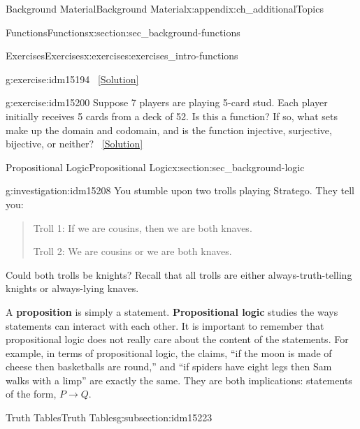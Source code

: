 \documentclass[oneside,10pt,]{book}
\newcommand{\terminology}[1]{\textbf{#1}}
\numberwithin{equation}{chapter}
\def\imp{\rightarrow}
\begin{document}
\begin{appendixptx}{Background Material}{}{Background Material}{}{}{x:appendix:ch_additionalTopics}
\begin{sectionptx}{Functions}{}{Functions}{}{}{x:section:sec_background-functions}
\begin{exercises-subsection}{Exercises}{}{Exercises}{}{}{x:exercises:exercises_intro-functions}
\begin{divisionexercise}{16}{}{}{g:exercise:idm15194}
\qquad~\hfill{\tiny\hyperlink{g:solution:idm15198-main}{[Solution]}}\end{divisionexercise}%
\begin{divisionexercise}{17}{}{}{g:exercise:idm15200}%
Suppose 7 players are playing 5-card stud. Each player initially receives 5 cards from a deck of 52. Is this a function? If so, what sets make up the domain and codomain, and is the function injective, surjective, bijective, or neither?%
\qquad~\hfill{\tiny\hyperlink{g:solution:idm15203-main}{[Solution]}}\end{divisionexercise}%
\end{exercises-subsection}
\end{sectionptx}
%
%
\typeout{************************************************}
\typeout{************************************************}
%
\begin{sectionptx}{Propositional Logic}{}{Propositional Logic}{}{}{x:section:sec_background-logic}
\begin{introduction}{}%
\begin{investigation}{}{g:investigation:idm15208}%
You stumble upon two trolls playing Stratego\textregistered{}.  They tell you:%
\begin{quote}%
Troll 1: If we are cousins, then we are both knaves.%
\par
Troll 2: We are cousins or we are both knaves.%
\end{quote}
Could both trolls be knights?  Recall that all trolls are either always-truth-telling knights or always-lying knaves.%
\end{investigation}
A \terminology{proposition} is simply a statement. \terminology{Propositional logic} studies the ways statements can interact with each other. It is important to remember that propositional logic does not really care about the content of the statements. For example, in terms of propositional logic, the claims, ``if the moon is made of cheese then basketballs are round,'' and ``if spiders have eight legs then Sam walks with a limp'' are exactly the same. They are both implications: statements of the form, \(P \imp Q\).%
\end{introduction}%
%
%
\typeout{************************************************}
\typeout{************************************************}
%
\begin{subsectionptx}{Truth Tables}{}{Truth Tables}{}{}{g:subsection:idm15223}
%

\end{subsectionptx}
\end{sectionptx}
\end{appendixptx}
\end{document}
